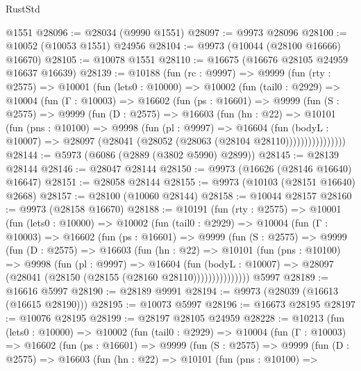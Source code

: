 \begin{lexlean}{RustStd}
\begin{coremodule}
    @1551
@28096 := @28034 (@9990 @1551)
@28097 := @9973 @28096
@28100 := @10052 (@10053 @1551) @24956
@28104 := @9973 (@10044 (@28100 @16666) @16670)
@28105 := @10078 @1551
@28110 := @16675 (@16676 @28105 @24959 @16637 @16639)
@28139 := @10188
    (fun (rc : @9997) =>
    @9999
      (fun (rty : @2575) =>
      @10001
        (fun (lets0 : @10000) =>
        @10002
          (fun (tail0 : @2929) =>
          @10004
            (fun (Γ : @10003) =>
            @16602
              (fun (ps : @16601) =>
              @9999
                (fun (S : @2575) =>
                @9999
                  (fun (D : @2575) =>
                  @16603
                    (fun (hn : @22) =>
                    @10101
                      (fun (pns : @10100) =>
                      @9998
                        (fun (pl : @9997) =>
                        @16604
                          (fun (bodyL : @10007) =>
                          @28097 (@28041 (@28052 (@28063 (@28104 @28110))))))))))))))))
@28144 := @5973 (@6086 (@2889 (@3802 @5990) @2899))
@28145 := @28139 @28144
@28146 := @28047 @28144
@28150 := @9973 (@16626 (@28146 @16640) @16647)
@28151 := @28058 @28144
@28155 := @9973 (@10103 (@28151 @16640) @2668)
@28157 := @28100 (@10060 @28144)
@28158 := @10044 @28157
@28160 := @9973 (@28158 @16670)
@28188 := @10191
    (fun (rty : @2575) =>
    @10001
      (fun (lets0 : @10000) =>
      @10002
        (fun (tail0 : @2929) =>
        @10004
          (fun (Γ : @10003) =>
          @16602
            (fun (ps : @16601) =>
            @9999
              (fun (S : @2575) =>
              @9999
                (fun (D : @2575) =>
                @16603
                  (fun (hn : @22) =>
                  @10101
                    (fun (pns : @10100) =>
                    @9998
                      (fun (pl : @9997) =>
                      @16604
                        (fun (bodyL : @10007) =>
                        @28097 (@28041 (@28150 (@28155 (@28160 @28110)))))))))))))))
    @5997
@28189 := @16616 @5997
@28190 := @28189 @9991
@28194 := @9973 (@28039 (@16613 (@16615 @28190)))
@28195 := @10073 @5997
@28196 := @16673 @28195
@28197 := @10076 @28195
@28199 := @28197 @28105 @24959
@28228 := @10213
    (fun (lets0 : @10000) =>
    @10002
      (fun (tail0 : @2929) =>
      @10004
        (fun (Γ : @10003) =>
        @16602
          (fun (ps : @16601) =>
          @9999
            (fun (S : @2575) =>
            @9999
              (fun (D : @2575) =>
              @16603
                (fun (hn : @22) =>
                @10101
                  (fun (pns : @10100) =>

\end{coremodule}
\end{lexlean}
